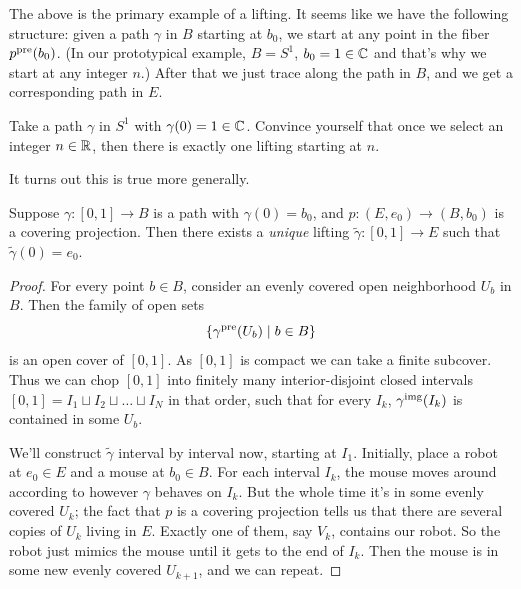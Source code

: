 The above is the primary example of a lifting.
It seems like we have the following structure: given a path $\gamma$
in $B$ starting at $b_0$, we start at any point in the fiber $p^{\text{pre}}(b_0)$.
(In our prototypical example, $B = S^1$, $b_0 = 1 \in \mathbb C$
and that's why we start at any integer $n$.)
After that we just trace along the path in $B$, and we get
a corresponding path in $E$.
\begin{ques}
	Take a path $\gamma$ in $S^1$ with $\gamma(0) = 1 \in \mathbb C$.
	Convince yourself that once we select an integer $n \in \mathbb R$,
	then there is exactly one lifting starting at $n$.
\end{ques}

It turns out this is true more generally.
\begin{theorem}
	Suppose $\gamma \colon [0,1] \to B$ is a path with $\gamma(0) = b_0$, and
	$ p \colon (E,e_0) \to (B,b_0) $
	is a covering projection.
	Then there exists a \emph{unique} lifting $\tilde\gamma \colon [0,1] \to E$
	such that $\tilde\gamma(0) = e_0$.
\end{theorem}
\begin{proof}
	For every point $b \in B$, consider an evenly covered
	open neighborhood $U_b$ in $B$.
	Then the family of open sets
	\[ \left\{ \gamma^{\text{pre}}(U_b) \mid b \in B \right\} \]
	is an open cover of $[0,1]$.
	As $[0,1]$ is compact we can take a finite subcover.
	Thus we can chop $[0,1]$ into finitely many interior-disjoint closed intervals
	$[0,1] = I_1 \sqcup I_2 \sqcup \dots \sqcup I_N$ in that order,
	such that for every $I_k$, $\gamma^{\text{img}}(I_k)$ is contained
	in some $U_b$.

	We'll construct $\tilde\gamma$ interval by interval now,
	starting at $I_1$.
	Initially, place a robot at $e_0 \in E$ and a mouse at $b_0 \in B$.
	For each interval $I_k$, the mouse moves around according
	to however $\gamma$ behaves on $I_k$.
	But the whole time it's in some evenly covered $U_k$;
	the fact that $p$ is a covering projection tells us that
	there are several copies of $U_k$ living in $E$.
	Exactly one of them, say $V_k$, contains our robot.
	So the robot just mimics the mouse until it gets to the end of $I_k$.
	Then the mouse is in some new evenly covered $U_{k+1}$,
	and we can repeat.
\end{proof}

